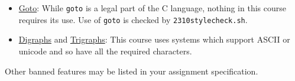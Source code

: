 \documentclass{article}
\begin{document}
\begin{itemize}
\item \underline{Goto}: While \texttt{goto} is a legal part of the C language, nothing in this course requires its use. Use of \texttt{goto} is checked by \texttt{2310stylecheck.sh}.
\item \underline{Digraphs} and \underline{Trigraphs}: This course uses systems which support ASCII or unicode and so have all the required characters.
\end{itemize}

\noindent Other banned features may be listed in your assignment specification.
\end{document}
